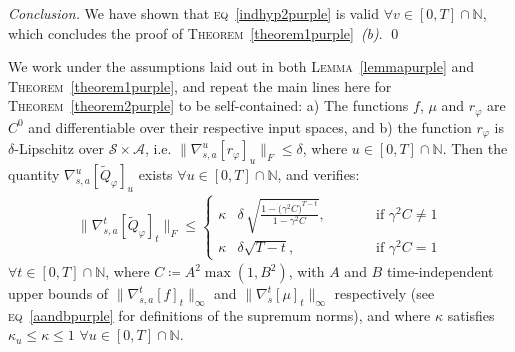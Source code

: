 \emph{Conclusion.} We have shown that \textsc{eq}~\ref{indhyp2purple} is valid
$\forall v \in [0, T] \cap \mathbb{N}$, which concludes the proof of
\textsc{Theorem}~\ref{theorem1purple}~\emph{(b)}. \qed

\begin{theorem}
\label{theorem2purple}
We work under the assumptions laid out in
both \textsc{Lemma}~\ref{lemmapurple} and \textsc{Theorem}~\ref{theorem1purple}, and repeat
the main lines here
for \textsc{Theorem}~\ref{theorem2purple} to be self-contained:
a) The functions $f$, $\mu$ and $r_\varphi$ are $C^0$ and differentiable
over their respective input spaces,
and b) the function $r_\varphi$ is $\delta$-Lipschitz
over $\mathcal{S} \times \mathcal{A}$, i.e.
$\lVert \nabla_{s,a}^u[r_\varphi]_u \rVert _F \leq \delta$,
where $u \in [0, T] \cap \mathbb{N}$.
Then the quantity $\nabla_{s,a}^u[\widetilde{Q}_\varphi]_u$ exists
$\forall u \in [0, T] \cap \mathbb{N}$,
and verifies:
\begin{align}
\lVert \nabla_{s,a}^t[\widetilde{Q}_\varphi]_t \rVert _F
\leq
\left\{
\begin{aligned}
\kappa &\delta \, \sqrt{\frac{1 - \big( \gamma^2 C \big)^{T - t}}{1 - \gamma^2 C}},
&\qquad  &\text{if $\gamma^2 C \neq 1$} \\
\kappa &\delta\sqrt{T - t},
&\qquad &\text{if $\gamma^2 C = 1$}
\end{aligned}
\right.
\end{align}
$\forall t \in [0, T] \cap \mathbb{N}$,
where
$C \coloneqq A^2 \max(1, B^2)$, with $A$ and $B$ time-independent upper bounds of
$\lVert\nabla_{s,a}^t[f]_t\rVert _\infty$ and $\lVert\nabla_s^t[\mu]_t\rVert _\infty$
respectively
(see \textsc{eq}~\ref{aandbpurple} for definitions of the supremum norms),
and where $\kappa$ satisfies $\kappa_u \leq \kappa \leq 1$ $\forall u \in [0, T] \cap \mathbb{N}$.
\end{theorem}

